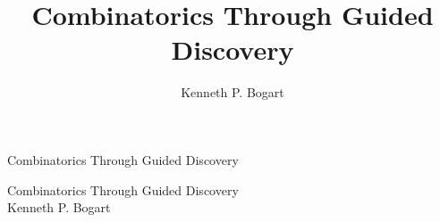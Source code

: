 \documentclass[10pt,]{book}
\title{Combinatorics Through Guided Discovery}
\author{Kenneth P. Bogart
}
\date{}
\theoremstyle{plain}
\theoremstyle{definition}
\theoremstyle{definition}
\numberwithin{equation}{chapter}
\begin{document}
\frontmatter
\thispagestyle{empty}
{\centering
\vspace*{0.28\textheight}
{\Huge Combinatorics Through Guided Discovery}\\}
\clearpage
\thispagestyle{empty}
\null%
\clearpage
\thispagestyle{empty}
{\centering
\vspace*{0.14\textheight}
{\Huge Combinatorics Through Guided Discovery}\\[3\baselineskip]
{\Large Kenneth P. Bogart}\\}
\clearpage
\thispagestyle{empty}
\null\clearpage
\end{document}

